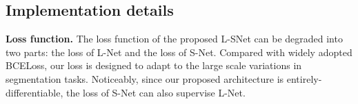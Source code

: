 \documentclass{article}
\begin{document}


\vspace{-10pt}
\subsection{Implementation details}
\vspace{-5pt}
\label{subsec:implementation-details}
\textbf{Loss function.}
The loss function of the proposed L-SNet can be degraded into two parts: the loss of L-Net and the loss of S-Net. 
Compared with widely adopted BCELoss, our loss is designed to adapt to the large scale variations in segmentation tasks.
Noticeably, since our proposed architecture is entirely-differentiable, the loss of S-Net can also supervise L-Net. \par
\end{document}
